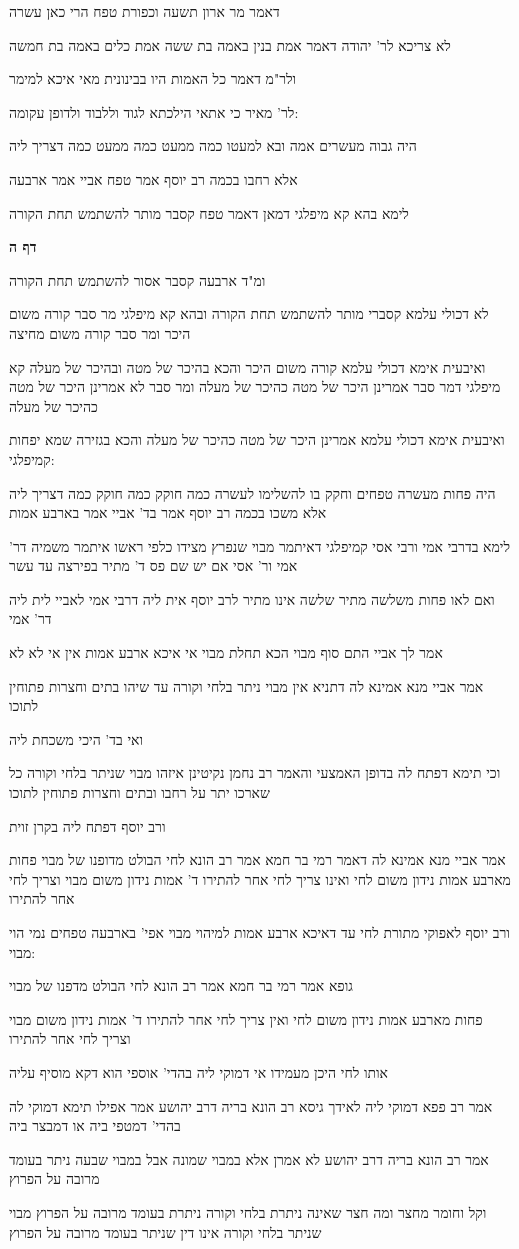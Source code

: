 \documentclass[12pt, openany]{book}
\newcommand{\sethebfont}{
\fontsize{10.5pt}{21.0pt} \selectfont
}
\newcommand{\textblock}[1]{
{\sethebfont #1\\}	
}
\newcommand{\sectname}{}
\newcommand{\newsection}[1]{
	\addcontentsline{toc}{section}{#1}
	\renewcommand{\sectname}{#1}	
	\vspace{-\baselineskip}
	\begin{center}
		\textbf{%
\fontsize{16pt}{16pt}\selectfont
			#1}
	\end{center}
	\vspace{-\baselineskip}
	\nopagebreak
}
\begin{document}
\textblock{דאמר מר ארון תשעה וכפורת טפח הרי כאן עשרה}
\textblock{לא צריכא לר' יהודה דאמר אמת בנין באמה בת ששה אמת כלים באמה בת חמשה}
\textblock{ולר"מ דאמר כל האמות היו בבינונית מאי איכא למימר}
\textblock{לר' מאיר כי אתאי הילכתא לגוד וללבוד ולדופן עקומה:}
\textblock{היה גבוה מעשרים אמה ובא למעטו כמה ממעט כמה ממעט כמה דצריך ליה}
\textblock{אלא רחבו בכמה רב יוסף אמר טפח אביי אמר ארבעה}
\textblock{לימא בהא קא מיפלגי דמאן דאמר טפח קסבר מותר להשתמש תחת הקורה}
\newsection{דף ה}
\textblock{ומ"ד ארבעה קסבר אסור להשתמש תחת הקורה}
\textblock{לא דכולי עלמא קסברי מותר להשתמש תחת הקורה ובהא קא מיפלגי מר סבר קורה משום היכר ומר סבר קורה משום מחיצה}
\textblock{ואיבעית אימא דכולי עלמא קורה משום היכר והכא בהיכר של מטה ובהיכר של מעלה קא מיפלגי דמר סבר אמרינן היכר של מטה כהיכר של מעלה ומר סבר לא אמרינן היכר של מטה כהיכר של מעלה}
\textblock{ואיבעית אימא דכולי עלמא אמרינן היכר של מטה כהיכר של מעלה והכא בגזירה שמא יפחות קמיפלגי:}
\textblock{היה פחות מעשרה טפחים וחקק בו להשלימו לעשרה כמה חוקק כמה חוקק כמה דצריך ליה אלא משכו בכמה רב יוסף אמר בד' אביי אמר בארבע אמות}
\textblock{לימא בדרבי אמי ורבי אסי קמיפלגי דאיתמר מבוי שנפרץ מצידו כלפי ראשו איתמר משמיה דר' אמי ור' אסי אם יש שם פס ד' מתיר בפירצה עד עשר}
\textblock{ואם לאו פחות משלשה מתיר שלשה אינו מתיר לרב יוסף אית ליה דרבי אמי לאביי לית ליה דר' אמי}
\textblock{אמר לך אביי התם סוף מבוי הכא תחלת מבוי אי איכא ארבע אמות אין אי לא לא}
\textblock{אמר אביי מנא אמינא לה דתניא אין מבוי ניתר בלחי וקורה עד שיהו בתים וחצרות פתוחין לתוכו}
\textblock{ואי בד' היכי משכחת ליה}
\textblock{וכי תימא דפתח לה בדופן האמצעי והאמר רב נחמן נקיטינן איזהו מבוי שניתר בלחי וקורה כל שארכו יתר על רחבו ובתים וחצרות פתוחין לתוכו}
\textblock{ורב יוסף דפתח ליה בקרן זוית}
\textblock{אמר אביי מנא אמינא לה דאמר רמי בר חמא אמר רב הונא לחי הבולט מדופנו של מבוי פחות מארבע אמות נידון משום לחי ואינו צריך לחי אחר להתירו ד' אמות נידון משום מבוי וצריך לחי אחר להתירו}
\textblock{ורב יוסף לאפוקי מתורת לחי עד דאיכא ארבע אמות למיהוי מבוי אפי' בארבעה טפחים נמי הוי מבוי:}
\textblock{גופא אמר רמי בר חמא אמר רב הונא לחי הבולט מדפנו של מבוי}
\textblock{פחות מארבע אמות נידון משום לחי ואין צריך לחי אחר להתירו ד' אמות נידון משום מבוי וצריך לחי אחר להתירו}
\textblock{אותו לחי היכן מעמידו אי דמוקי ליה בהדי' אוספי הוא דקא מוסיף עליה}
\textblock{אמר רב פפא דמוקי ליה לאידך גיסא רב הונא בריה דרב יהושע אמר אפילו תימא דמוקי לה בהדי' דמטפי ביה או דמבצר ביה}
\textblock{אמר רב הונא בריה דרב יהושע לא אמרן אלא במבוי שמונה אבל במבוי שבעה ניתר בעומד מרובה על הפרוץ}
\textblock{וקל וחומר מחצר ומה חצר שאינה ניתרת בלחי וקורה ניתרת בעומד מרובה על הפרוץ מבוי שניתר בלחי וקורה אינו דין שניתר בעומד מרובה על הפרוץ}
\end{document}
